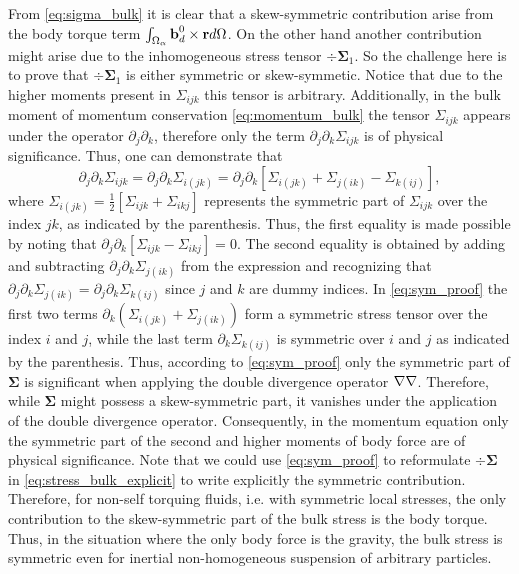 From \ref{eq:sigma_bulk} it is clear that a skew-symmetric contribution arise from the body torque term $\int_{\Omega_\alpha} \textbf{b}_d^0 \times \textbf{r} d\Omega$. 
On the other hand another contribution might arise due to the inhomogeneous stress tensor $\div \bm\Sigma_1$. 
So the challenge here is to prove that  $\div \bm\Sigma_1$ is either symmetric or skew-symmetic. 
Notice that due to the higher moments present in $\Sigma_{ijk}$ this tensor is arbitrary. 
Additionally, in the bulk moment of momentum conservation \eqref{eq:momentum_bulk} the tensor $\Sigma_{ijk}$ appears under the operator $\partial_j \partial_k$, therefore only the term $\partial_j \partial_k \Sigma_{ijk}$ is of physical significance. 
Thus, one can demonstrate that \citep{lhuillier1996contribution}
\begin{equation}
    \partial_j \partial_k \Sigma_{ijk}
    = \partial_j \partial_k \Sigma_{i(jk)}
    =
    \partial_j \partial_k \left[
        \Sigma_{i(jk)}
        + \Sigma_{j(ik)}
        - \Sigma_{k(ij)}
    \right],
    \label{eq:sym_proof}
\end{equation}
where $\Sigma_{i(jk)} = \frac{1}{2}[\Sigma_{ijk} + \Sigma_{ikj}]$ represents the symmetric part of $\Sigma_{ijk}$ over the index $jk$, as indicated by the parenthesis. 
Thus, the first equality is made possible by noting that $\partial_j \partial_k [\Sigma_{ijk} - \Sigma_{ikj}] = 0$.
The second equality is obtained by adding and subtracting $\partial_j \partial_k \Sigma_{j(ik)}$ from the expression and recognizing that $\partial_j \partial_k \Sigma_{j(ik)} = \partial_j \partial_k \Sigma_{k(ij)}$ since $j$ and $k$ are dummy indices. 
In \ref{eq:sym_proof} the first two terms $\partial_k(\Sigma_{i(jk)} + \Sigma_{j(ik)})$ form a symmetric stress tensor over the index $i$ and $j$, while the last term $\partial_k\Sigma_{k(ij)}$ is symmetric over $i$ and $j$ as indicated by the parenthesis. 
Thus, according to \ref{eq:sym_proof} only the symmetric part of $\bm\Sigma$ is significant when applying the double divergence operator $\mathbf{\nabla}\mathbf{\nabla}$. 
Therefore, while $\bm\Sigma$ might possess a skew-symmetric part, it vanishes under the application of the double divergence operator. 
Consequently, in the momentum equation only the symmetric part of the second and higher moments of body force are of physical significance.
Note that we could use \ref{eq:sym_proof} to reformulate $\div\bm\Sigma$ in \ref{eq:stress_bulk_explicit} to write explicitly the symmetric contribution. 
Therefore, for non-self torquing fluids, i.e. with symmetric local stresses,  the only contribution to the skew-symmetric part of the bulk stress is the body torque.
Thus, in the situation where the only body force is the gravity, the bulk stress is symmetric even for inertial non-homogeneous suspension of arbitrary particles. 

